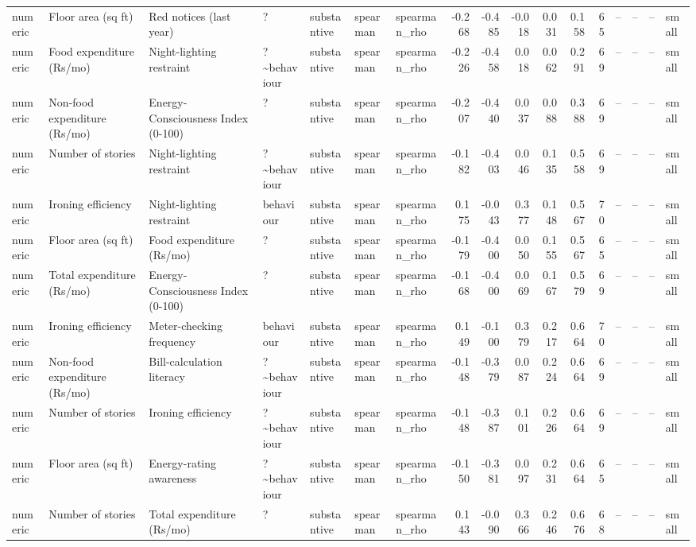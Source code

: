 \begin{table}
\begin{tabular}{lllllllrrrrrrrrrl}
numeric & Floor area (sq ft) & Red notices (last year) & ? & substantive & spearman & spearman\_rho & -0.268 & -0.485 & -0.018 & 0.031 & 0.158 & 65 & -- & -- & -- & small \\
numeric & Food expenditure (Rs/mo) & Night-lighting restraint & ?\textasciitilde behaviour & substantive & spearman & spearman\_rho & -0.226 & -0.458 & 0.018 & 0.062 & 0.291 & 69 & -- & -- & -- & small \\
numeric & Non-food expenditure (Rs/mo) & Energy-Consciousness Index (0-100) & ? & substantive & spearman & spearman\_rho & -0.207 & -0.440 & 0.037 & 0.088 & 0.388 & 69 & -- & -- & -- & small \\
numeric & Number of stories & Night-lighting restraint & ?\textasciitilde behaviour & substantive & spearman & spearman\_rho & -0.182 & -0.403 & 0.046 & 0.135 & 0.558 & 69 & -- & -- & -- & small \\
numeric & Ironing efficiency & Night-lighting restraint & behaviour & substantive & spearman & spearman\_rho & 0.175 & -0.043 & 0.377 & 0.148 & 0.567 & 70 & -- & -- & -- & small \\
numeric & Floor area (sq ft) & Food expenditure (Rs/mo) & ? & substantive & spearman & spearman\_rho & -0.179 & -0.400 & 0.050 & 0.155 & 0.567 & 65 & -- & -- & -- & small \\
numeric & Total expenditure (Rs/mo) & Energy-Consciousness Index (0-100) & ? & substantive & spearman & spearman\_rho & -0.168 & -0.400 & 0.069 & 0.167 & 0.579 & 69 & -- & -- & -- & small \\
numeric & Ironing efficiency & Meter-checking frequency & behaviour & substantive & spearman & spearman\_rho & 0.149 & -0.100 & 0.379 & 0.217 & 0.664 & 70 & -- & -- & -- & small \\
numeric & Non-food expenditure (Rs/mo) & Bill-calculation literacy & ?\textasciitilde behaviour & substantive & spearman & spearman\_rho & -0.148 & -0.379 & 0.087 & 0.224 & 0.664 & 69 & -- & -- & -- & small \\
numeric & Number of stories & Ironing efficiency & ?\textasciitilde behaviour & substantive & spearman & spearman\_rho & -0.148 & -0.387 & 0.101 & 0.226 & 0.664 & 69 & -- & -- & -- & small \\
numeric & Floor area (sq ft) & Energy-rating awareness & ?\textasciitilde behaviour & substantive & spearman & spearman\_rho & -0.150 & -0.381 & 0.097 & 0.231 & 0.664 & 65 & -- & -- & -- & small \\
numeric & Number of stories & Total expenditure (Rs/mo) & ? & substantive & spearman & spearman\_rho & 0.143 & -0.090 & 0.366 & 0.246 & 0.676 & 68 & -- & -- & -- & small \\

\end{tabular}
\end{table}
